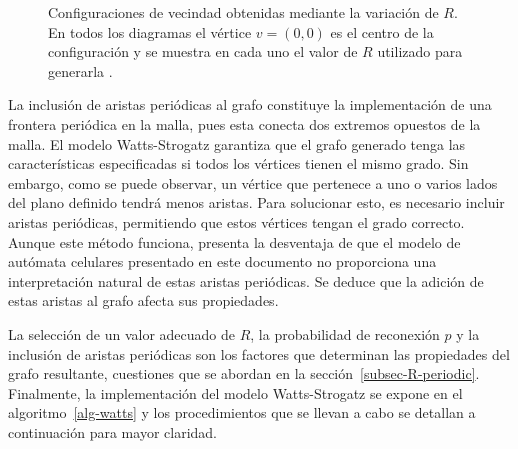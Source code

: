 \begin{figure}[!ht]
\begin{center}
\end{center}\vspace*{-0.6cm}
\caption[Configuraciones de vecindad obtenidas mediante la variaci\'on de $R$]{Configuraciones de vecindad obtenidas mediante la variaci\'on de $R$. En todos los diagramas el v\'ertice $v=(0,0)$ es el centro de la configuraci\'on y se muestra en cada uno el valor de $R$ utilizado para generarla \cite{viabarre2019}.}
\label{fig-neighbour}
\end{figure}

La inclusi\'on de aristas peri\'odicas al grafo constituye la implementaci\'on de una frontera peri\'odica en la malla, pues esta conecta dos extremos opuestos de la malla. El modelo Watts-Strogatz garantiza que el grafo generado tenga las características especificadas si todos los vértices tienen el mismo grado. Sin embargo, como se puede observar, un vértice que pertenece a uno o varios lados del plano definido tendrá menos aristas. Para solucionar esto, es necesario incluir aristas periódicas, permitiendo que estos vértices tengan el grado correcto. Aunque este método funciona, presenta la desventaja de que el modelo de autómata celulares presentado en este documento no proporciona una interpretación natural de estas aristas periódicas. Se deduce que la adición de estas aristas al grafo afecta sus propiedades.

La selecci\'on de un valor adecuado de $R$, la probabilidad de reconexi\'on $p$ y la inclusi\'on de aristas peri\'odicas son los factores que determinan las propiedades del grafo resultante, cuestiones que se abordan en la secci\'on~\ref{subsec-R-periodic}. Finalmente, la implementaci\'on del modelo Watts-Strogatz se expone en el algoritmo~\ref{alg-watts} y los procedimientos que se llevan a cabo se detallan a continuaci\'on para mayor claridad.

